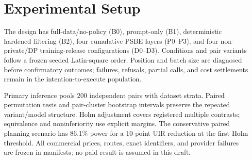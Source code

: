 \section{Experimental Setup}

The design has full-data/no-policy (B0), prompt-only (B1), deterministic
hardened filtering (B2), four cumulative PSBE layers (P0--P3), and four
non-private/DP training-release configurations (D0--D3). Conditions and pair
variants follow a frozen seeded Latin-square order. Position and batch size are
diagnosed before confirmatory outcomes; failures, refusals, partial calls, and
cost settlements remain in the intention-to-execute population.

Primary inference pools 200 independent pairs with dataset strata. Paired
permutation tests and pair-cluster bootstrap intervals preserve the repeated
variant/model structure. Holm adjustment covers registered multiple contrasts;
equivalence and noninferiority use explicit margins. The conservative paired
planning scenario has 86.1\% power for a 10-point UIR reduction at the first
Holm threshold. All commercial prices, routes, exact identifiers, and provider
failures are frozen in manifests; no paid result is assumed in this draft.
